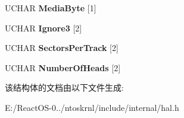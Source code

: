 \begin{DoxyCompactItemize}
U\+C\+H\+AR {\bfseries Media\+Byte} \mbox{[}1\mbox{]}
\item 
\mbox{\label{struct___b_o_o_t___s_e_c_t_o_r___i_n_f_o_ab9efa67bf9049201d344252e7924c6d7}} 
U\+C\+H\+AR {\bfseries Ignore3} \mbox{[}2\mbox{]}
\item 
\mbox{\label{struct___b_o_o_t___s_e_c_t_o_r___i_n_f_o_a3487eecd4d8c6e224f9f4a6cf3552381}} 
U\+C\+H\+AR {\bfseries Sectors\+Per\+Track} \mbox{[}2\mbox{]}
\item 
\mbox{\label{struct___b_o_o_t___s_e_c_t_o_r___i_n_f_o_a6e2457fb75ba66593e6fcf92427f1084}} 
U\+C\+H\+AR {\bfseries Number\+Of\+Heads} \mbox{[}2\mbox{]}
\end{DoxyCompactItemize}


该结构体的文档由以下文件生成\+:\begin{DoxyCompactItemize}
\item 
E\+:/\+React\+O\+S-\/0../ntoskrnl/include/internal/hal.\+h\end{DoxyCompactItemize}
